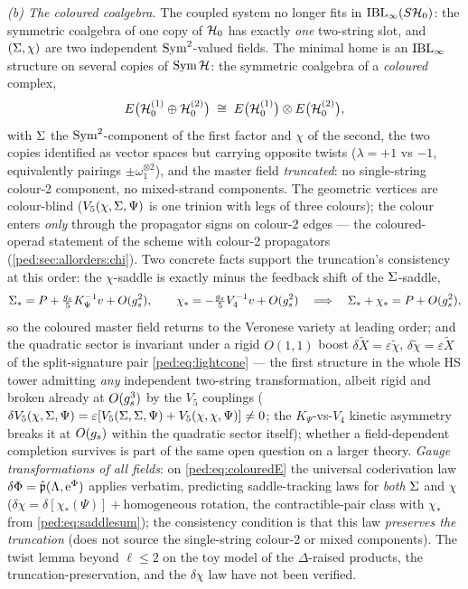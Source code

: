 \emph{(b) The coloured coalgebra.} The coupled system no longer fits in
$\mathrm{IBL}_\infty(S\mathcal{H}_0)$: the symmetric coalgebra of one copy of $\mathcal{H}_0$ has exactly
\emph{one} two-string slot, and $(\Sigma,\chi)$ are two independent $\operatorname{Sym}^2$-valued
fields. The minimal home is an $\mathrm{IBL}_\infty$ structure on several
copies of $\operatorname{Sym}\mathcal{H}$: the symmetric coalgebra of a \emph{coloured} complex,
\begin{equation}
	E\big(\mathcal{H}_0^{(1)}\oplus\mathcal{H}_0^{(2)}\big)\;\cong\;E\big(\mathcal{H}_0^{(1)}\big)\otimes
	E\big(\mathcal{H}_0^{(2)}\big),
	\label{ped:eq:colouredE}
\end{equation}
with $\Sigma$ the $\operatorname{Sym}^2$-component of the first factor and $\chi$ of the second, the
two copies identified as vector spaces but carrying opposite twists
($\lambda=+1$ vs $-1$, equivalently pairings $\pm\omega_1^{\otimes2}$), and the master
field \emph{truncated}: no single-string colour-2 component, no mixed-strand
components. The geometric vertices are colour-blind ($V_5(\chi,\Sigma,\Psi)$ is one
trinion with legs of three colours); the colour enters \emph{only} through the
propagator signs on colour-2 edges --- the coloured-operad statement of the scheme with colour-2 propagators
(\cref{ped:sec:allorders:chi}). Two concrete facts support the truncation's consistency at
this order: the $\chi$-saddle is exactly minus the feedback shift of the $\Sigma$-saddle,
\begin{equation}
	\Sigma_*=P+\tfrac{g_s}5 K_\Psi^{-1}v+O(g_s^2),
	\qquad
	\chi_*=-\tfrac{g_s}5 V_4^{-1}v+O(g_s^2)
	\quad\Longrightarrow\quad
	\Sigma_*+\chi_*=P+O(g_s^2),
	\label{ped:eq:saddlesum}
\end{equation}
so the coloured master field returns to the Veronese variety at leading order; and the
quadratic sector is invariant under a rigid $O(1,1)$ boost $\delta\tilde X=
\varepsilon\tilde\chi$, $\delta\tilde\chi=\varepsilon\tilde X$ of the split-signature
pair \eqref{ped:eq:lightcone} --- the first structure in the whole HS tower admitting
\emph{any} independent two-string transformation, albeit rigid and broken already
at $O(g_s^3)$ by the $V_5$ couplings ($\delta V_5(\chi,\Sigma,\Psi)=\varepsilon
[V_5(\Sigma,\Sigma,\Psi)+V_5(\chi,\chi,\Psi)]\neq0$; the $K_\Psi$-vs-$V_4$ kinetic
asymmetry breaks it at $O(g_s)$ within the quadratic sector itself); whether a field-dependent
completion survives is part of the same open question on a larger theory. \emph{Gauge transformations of all
fields}: on \eqref{ped:eq:colouredE} the universal coderivation law
$\delta\Phi=\hat{\mathfrak p}(\Lambda,\mathrm{e}^\Phi)$ applies verbatim, predicting
saddle-tracking laws for \emph{both} $\Sigma$ and $\chi$
($\delta\chi=\delta[\chi_*(\Psi)]+\text{homogeneous rotation}$, the
contractible-pair class with $\chi_*$ from \eqref{ped:eq:saddlesum}); the consistency
condition is that this law \emph{preserves the truncation} (does not source the
single-string colour-2 or mixed components). The twist lemma beyond
$\ell\le2$ on the toy model of the $\Delta$-raised products, the truncation-preservation, and the $\delta\chi$
law have not been verified.

